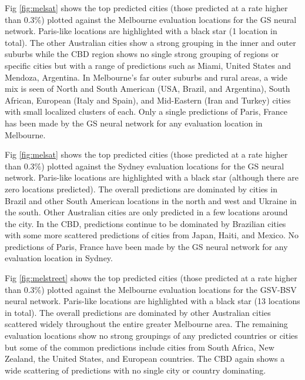 \documentclass[10pt,letterpaper]{article}
\begin{document}
Fig \ref{fig:melsat} shows the top predicted cities (those predicted at a rate higher than 0.3\%) plotted against the Melbourne evaluation locations for the GS neural network. Paris-like locations are highlighted with a black star (1 location in total). The other Australian cities show a strong grouping in the inner and outer suburbs while the CBD region shows no single strong grouping of regions or specific cities but with a range of predictions such as Miami, United States and Mendoza, Argentina. In Melbourne's far outer suburbs and rural areas, a wide mix is seen of North and South American (USA, Brazil, and Argentina), South African, European (Italy and Spain), and Mid-Eastern (Iran and Turkey) cities with small localized clusters of each. Only a single predictions of Paris, France has been made by the GS neural network for any evaluation location in Melbourne.


Fig \ref{fig:melsat} shows the top predicted cities (those predicted at a rate higher than 0.3\%) plotted against the Sydney evaluation locations for the GS neural network. Paris-like locations are highlighted with a black star (although there are zero locations predicted). The overall predictions are dominated by cities in Brazil and other South American locations in the north and west and Ukraine in the south. Other Australian cities are only predicted in a few locations around the city. In the CBD, predictions continue to be dominated by Brazilian cities with some more scattered predictions of cities from Japan, Haiti, and Mexico. No predictions of Paris, France have been made by the GS neural network for any evaluation location in Sydney.

Fig \ref{fig:melstreet} shows the top predicted cities (those predicted at a rate higher than 0.3\%) plotted against the Melbourne evaluation locations for the GSV-BSV neural network. Paris-like locations are highlighted with a black star (13 locations in total). The overall predictions are dominated by other Australian cities scattered widely throughout the entire greater Melbourne area. The remaining evaluation locations show no strong groupings of any predicted countries or cities but some of the common predictions include cities from South Africa, New Zealand, the United States, and European countries. The CBD again shows a wide scattering of predictions with no single city or country dominating.
\end{document}
